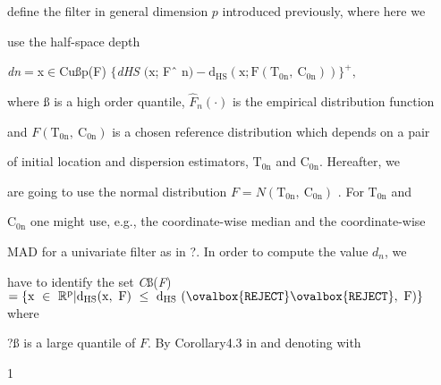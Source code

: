 \documentclass[a4paper,12pt]{article}
\begin{document}
define the filter in general dimension $p$ introduced previously, where here we

use the half-space depth

{\it dn}$=$x$\in$Cußp(F) $\{${\it dHS} $(\mathrm{x}$; Fˆ $\mathrm{n})-\mathrm{d}_{\mathrm{H}\mathrm{S}}(\mathrm{x};\mathrm{F}(\mathrm{T}_{0\mathrm{n}},\ \mathrm{C}_{0\mathrm{n}}))\}^{+},$

where ß is a high order quantile, $\hat{F}_{n}(\cdot)$ is the empirical distribution function

and $F(\mathrm{T}_{0\mathrm{n}},\ \mathrm{C}_{0\mathrm{n}})$ is a chosen reference distribution which depends on a pair

of initial location and dispersion estimators, $\mathrm{T}_{0\mathrm{n}}$ and $\mathrm{C}_{0\mathrm{n}}$. Hereafter, we

are going to use the normal distribution $F = N(\mathrm{T}_{0\mathrm{n}},\ \mathrm{C}_{0\mathrm{n}})$ . For $\mathrm{T}_{0\mathrm{n}}$ and

$\mathrm{C}_{0\mathrm{n}}$ one might use, e.g., the coordinate-wise median and the coordinate-wise

MAD for a univariate filter as in ?. In order to compute the value $d_{n}$, we

have to identify the set {\it C}ß({\it F}) $= \{\mathrm{x}\ \in\ \mathbb{R}^{\mathrm{p}}|\mathrm{d}_{\mathrm{H}\mathrm{S}}(\mathrm{x},\ \mathrm{F})\ \leq\ \mathrm{d}_{\mathrm{H}\mathrm{S}}\ (\ovalbox{\tt\small REJECT}\ovalbox{\tt\small REJECT},\ \mathrm{F})\}$ where

?ß is a large quantile of $F$. By Corollary4.3 in and denoting with

1
\end{document}
